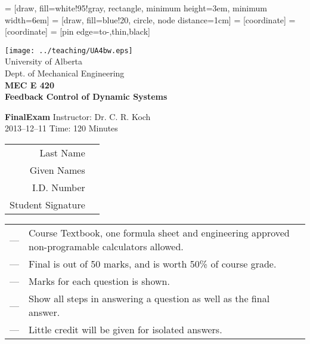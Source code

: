 \documentclass[12pt,legalpaper]{exam}
\newcommand{\semyear}{2013}
\newcommand{\assignnum}{Final}
\begin{document}
\setcounter{figure}{0}
\setcounter{page}{1}
\setcounter{section}{0}
\bigskip
{} = [draw, fill=white!95!gray, rectangle, minimum height=3em, minimum width=6em]
 = [draw, fill=blue!20, circle, node distance=1cm]
 = [coordinate]
 = [coordinate]
 = [pin edge={to-,thin,black}]

\begin{center}
    \texttt{[image: ../teaching/UA4bw.eps]}\\
    University of Alberta\\
    Dept. of Mechanical Engineering\\
    \large\bfseries\sffamily MEC E 420\\
    \large\bfseries\sffamily Feedback Control \normalsize of
    \large\bfseries\sffamily Dynamic Systems
\end{center}
\vspace{0.5cm}
\normalsize
{\bf \assignnum Exam }
\hfill
Instructor: Dr. C. R. Koch\\
\semyear--12--11
\hfill
Time: 120 Minutes
\vspace*{-6ex}
\hrulefill
\vspace{2cm}
{\large\sffamily
\begin{tabular}{rp{6cm}}
  Last Name & \begin{comment} pyxam!last_name \end{comment} \\
  Given Names &\begin{comment} pyxam!first_name \end{comment} \\
  I.D. Number & \begin{comment} pyxam!id_number \end{comment} \\
  Student Signature & \hrulefill \\
\end{tabular}
}
\vspace{1cm}
\hrulefill
\begin{tabular}{rp{16cm}}
  --- & Course Textbook, one formula sheet and engineering approved non-programable calculators allowed.\\
  --- & Final is out of 50 marks, and is worth 50\% of course grade.\\
  --- &  Marks for each question is shown.\\
  --- & Show all steps in answering a question as well as the final answer.\\
  --- & Little credit will be given for isolated answers.
\end{tabular}
\end{document}
